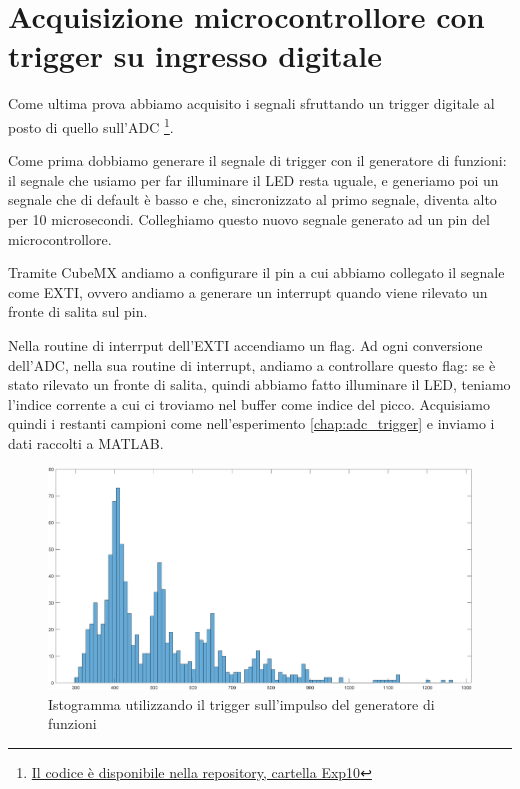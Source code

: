 \section*{Acquisizione microcontrollore con trigger su ingresso digitale}
Come ultima prova abbiamo acquisito i segnali sfruttando un trigger digitale al posto di quello sull'ADC \footnote{\href{https://github.com/fdila/electronics-experimentation/tree/main/Exp10}{Il codice è disponibile nella repository, cartella Exp10}}. 

Come prima dobbiamo generare il segnale di trigger con il generatore di funzioni: il segnale che usiamo per far illuminare il LED resta uguale, e generiamo poi un segnale che di default è basso e che, sincronizzato al primo segnale, diventa alto per 10 microsecondi. Colleghiamo questo nuovo segnale generato ad un pin del microcontrollore.

Tramite CubeMX andiamo a configurare il pin a cui abbiamo collegato il segnale come EXTI, ovvero andiamo a generare un interrupt quando viene rilevato un fronte di salita sul pin.

Nella routine di interrput dell'EXTI accendiamo un flag. Ad ogni conversione dell'ADC, nella sua routine di interrupt, andiamo a controllare questo flag: se è stato rilevato un fronte di salita, quindi abbiamo fatto illuminare il LED, teniamo l'indice corrente a cui ci troviamo nel buffer come indice del picco. Acquisiamo quindi i restanti campioni come nell'esperimento \ref{chap:adc_trigger} e inviamo i dati raccolti a MATLAB.


\begin{figure}[H]
\centering
\includegraphics[width=\textwidth]{assets/exp9/hist_matlab_5.png}
\caption{Istogramma utilizzando il trigger sull'impulso del generatore di funzioni}
\end{figure}